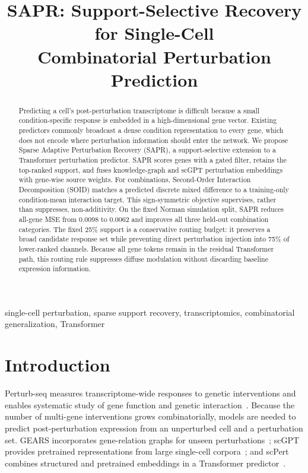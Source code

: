 \documentclass[conference]{IEEEtran}
\newcommand{\method}{SAPR}
\newcommand{\soid}{SOID}
\begin{document}
\title{SAPR: Support-Selective Recovery for Single-Cell\\
Combinatorial Perturbation Prediction}
\author{}
\maketitle

\begin{abstract}
Predicting a cell's post-perturbation transcriptome is difficult because a
small condition-specific response is embedded in a high-dimensional gene
vector. Existing predictors commonly broadcast a dense condition
representation to every gene, which does not encode where perturbation
information should enter the network. We propose Sparse Adaptive Perturbation
Recovery (\method), a support-selective extension to a Transformer perturbation
predictor. \method{} scores genes with a gated filter, retains the top-ranked
support, and fuses knowledge-graph and scGPT perturbation embeddings with
gene-wise source weights. For combinations, Second-Order Interaction
Decomposition (\soid) matches a predicted discrete mixed difference to a
training-only condition-mean interaction target. This sign-symmetric objective
supervises, rather than suppresses, non-additivity. On the fixed Norman
simulation split, \method{} reduces all-gene MSE
from 0.0098 to 0.0062 and improves all three held-out combination categories.
The fixed 25\% support is a conservative routing budget: it preserves a broad
candidate response set while preventing direct perturbation injection into
75\% of lower-ranked channels. Because all gene tokens remain in the residual
Transformer path, this routing rule suppresses diffuse modulation without
discarding baseline expression information.
\end{abstract}

\begin{IEEEkeywords}
single-cell perturbation, sparse support recovery, transcriptomics,
combinatorial generalization, Transformer
\end{IEEEkeywords}

\section{Introduction}
Perturb-seq measures transcriptome-wide responses to genetic interventions and
enables systematic study of gene function and genetic
interaction~\cite{norman2019}. Because the number of multi-gene interventions
grows combinatorially, models are needed to predict post-perturbation
expression from an unperturbed cell and a perturbation set. GEARS incorporates
gene-relation graphs for unseen perturbations~\cite{gears}; scGPT provides
pretrained representations from large single-cell corpora~\cite{scgpt}; and
scPert combines structured and pretrained embeddings in a Transformer
predictor~\cite{scpert}.
\end{document}
